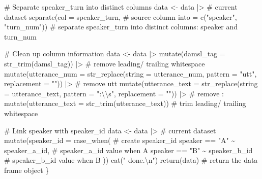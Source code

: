 \documentclass[
  letterpaper,
]{latex/krantz}
\newenvironment{Shaded}{\begin{snugshade}}{\end{snugshade}}
\newcommand{\AttributeTok}[1]{\textcolor[rgb]{0.40,0.45,0.13}{#1}}
\newcommand{\CommentTok}[1]{\textcolor[rgb]{0.37,0.37,0.37}{#1}}
\newcommand{\FunctionTok}[1]{\textcolor[rgb]{0.28,0.35,0.67}{#1}}
\newcommand{\NormalTok}[1]{\textcolor[rgb]{0.00,0.23,0.31}{#1}}
\newcommand{\OtherTok}[1]{\textcolor[rgb]{0.00,0.23,0.31}{#1}}
\newcommand{\SpecialCharTok}[1]{\textcolor[rgb]{0.37,0.37,0.37}{#1}}
\newcommand{\StringTok}[1]{\textcolor[rgb]{0.13,0.47,0.30}{#1}}
\begin{document}
\begin{Shaded}
\begin{Highlighting}[]
  \CommentTok{\# Separate speaker\_turn into distinct columns}
\NormalTok{  data }\OtherTok{\textless{}{-}}
\NormalTok{    data }\SpecialCharTok{|\textgreater{}} \CommentTok{\# current dataset}
    \FunctionTok{separate}\NormalTok{(}\AttributeTok{col =}\NormalTok{ speaker\_turn, }\CommentTok{\# source column}
             \AttributeTok{into =} \FunctionTok{c}\NormalTok{(}\StringTok{"speaker"}\NormalTok{, }\StringTok{"turn\_num"}\NormalTok{)) }\CommentTok{\# separate speaker\_turn into distinct columns: speaker and turn\_num}
  
  \CommentTok{\# Clean up column information}
\NormalTok{  data }\OtherTok{\textless{}{-}} 
\NormalTok{    data }\SpecialCharTok{|\textgreater{}} 
    \FunctionTok{mutate}\NormalTok{(}\AttributeTok{damsl\_tag =} \FunctionTok{str\_trim}\NormalTok{(damsl\_tag)) }\SpecialCharTok{|\textgreater{}} \CommentTok{\# remove leading/ trailing whitespace}
    \FunctionTok{mutate}\NormalTok{(}\AttributeTok{utterance\_num =} \FunctionTok{str\_replace}\NormalTok{(}\AttributeTok{string =}\NormalTok{ utterance\_num, }\AttributeTok{pattern =} \StringTok{"utt"}\NormalTok{, }\AttributeTok{replacement =} \StringTok{""}\NormalTok{)) }\SpecialCharTok{|\textgreater{}} \CommentTok{\# remove \textquotesingle{}utt\textquotesingle{}}
    \FunctionTok{mutate}\NormalTok{(}\AttributeTok{utterance\_text =} \FunctionTok{str\_replace}\NormalTok{(}\AttributeTok{string =}\NormalTok{ utterance\_text, }\AttributeTok{pattern =} \StringTok{":}\SpecialCharTok{\textbackslash{}\textbackslash{}}\StringTok{s"}\NormalTok{, }\AttributeTok{replacement =} \StringTok{""}\NormalTok{)) }\SpecialCharTok{|\textgreater{}} \CommentTok{\# remove \textquotesingle{}: \textquotesingle{}}
    \FunctionTok{mutate}\NormalTok{(}\AttributeTok{utterance\_text =} \FunctionTok{str\_trim}\NormalTok{(utterance\_text)) }\CommentTok{\# trim leading/ trailing whitespace}
  
  \CommentTok{\# Link speaker with speaker\_id}
\NormalTok{  data }\OtherTok{\textless{}{-}} 
\NormalTok{    data }\SpecialCharTok{|\textgreater{}} \CommentTok{\# current dataset}
    \FunctionTok{mutate}\NormalTok{(}\AttributeTok{speaker\_id =} \FunctionTok{case\_when}\NormalTok{( }\CommentTok{\# create speaker\_id}
\NormalTok{      speaker }\SpecialCharTok{==} \StringTok{"A"} \SpecialCharTok{\textasciitilde{}}\NormalTok{ speaker\_a\_id, }\CommentTok{\# speaker\_a\_id value when A}
\NormalTok{      speaker }\SpecialCharTok{==} \StringTok{"B"} \SpecialCharTok{\textasciitilde{}}\NormalTok{ speaker\_b\_id }\CommentTok{\# speaker\_b\_id value when B}
\NormalTok{    ))}
  \FunctionTok{cat}\NormalTok{(}\StringTok{" done.}\SpecialCharTok{\textbackslash{}n}\StringTok{"}\NormalTok{)}
  \FunctionTok{return}\NormalTok{(data) }\CommentTok{\# return the data frame object}
\NormalTok{\}}
\end{Highlighting}
\end{Shaded}
\end{document}
